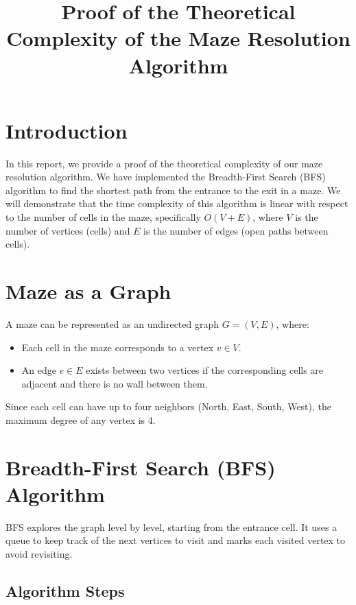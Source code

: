 \documentclass{article}
\begin{document}
\title{Proof of the Theoretical Complexity of the Maze Resolution Algorithm}
\author{}
\date{}
\maketitle

\section*{Introduction}

In this report, we provide a proof of the theoretical complexity of our maze resolution algorithm. We have implemented the Breadth-First Search (BFS) algorithm to find the shortest path from the entrance to the exit in a maze. We will demonstrate that the time complexity of this algorithm is linear with respect to the number of cells in the maze, specifically \(O(V + E)\), where \(V\) is the number of vertices (cells) and \(E\) is the number of edges (open paths between cells).

\section*{Maze as a Graph}

A maze can be represented as an undirected graph \(G = (V, E)\), where:

\begin{itemize}
    \item Each cell in the maze corresponds to a vertex \(v \in V\).
    \item An edge \(e \in E\) exists between two vertices if the corresponding cells are adjacent and there is no wall between them.
\end{itemize}

Since each cell can have up to four neighbors (North, East, South, West), the maximum degree of any vertex is 4.

\section*{Breadth-First Search (BFS) Algorithm}

BFS explores the graph level by level, starting from the entrance cell. It uses a queue to keep track of the next vertices to visit and marks each visited vertex to avoid revisiting.

\subsection*{Algorithm Steps}
\end{document}
